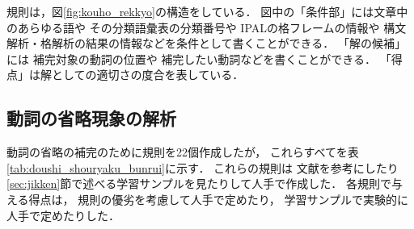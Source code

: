 \begin{figure}[t]
  \leavevmode
  \begin{center}
  \end{center}
\end{figure}

規則は，図\ref{fig:kouho_rekkyo}の構造をしている．
図中の「条件部」には文章中のあらゆる語や
その分類語彙表\cite{bgh}の分類番号や
IPALの格フレーム\cite{ipal}の情報や
構文解析・格解析の結果の情報などを条件として書くことができる．
「解の候補」には
補完対象の動詞の位置や
補完したい動詞などを書くことができる．
「得点」は解としての適切さの度合を表している．

\subsection{動詞の省略現象の解析}
\label{sec:0verb_rule}

動詞の省略の補完のために規則を22個作成したが，
これらすべてを表\ref{tab:doushi_shouryaku_bunrui}に示す．
これらの規則は
文献\cite{kouryakubun}\cite{jutsugo_takahashi}を参考にしたり
\ref{sec:jikken}節で述べる学習サンプルを見たりして人手で作成した．
各規則で与える得点は，
規則の優劣を考慮して人手で定めたり，
学習サンプルで実験的に人手で定めたりした．

